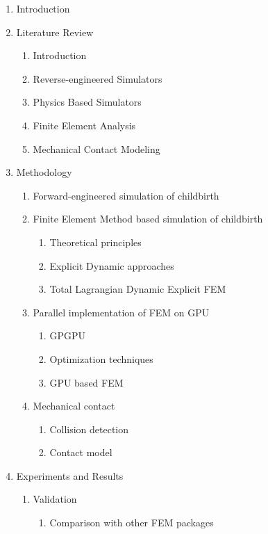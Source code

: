\label{proposedstructure}

\begin{enumerate}
\item Introduction
\item Literature Review
  \begin{enumerate}
  \item Introduction
  \item Reverse-engineered Simulators
  \item Physics Based Simulators
  \item Finite Element Analysis
  \item Mechanical Contact Modeling
  \end{enumerate}
\item Methodology
  \begin{enumerate}
    \item Forward-engineered simulation of childbirth
    \item Finite Element Method based simulation of childbirth
    \begin{enumerate}
      \item Theoretical principles
      \item Explicit Dynamic approaches
      \item Total Lagrangian Dynamic Explicit FEM
    \end{enumerate}
    \item Parallel implementation of FEM on GPU
    \begin{enumerate}
      \item GPGPU
      \item Optimization techniques
      \item GPU based FEM
    \end{enumerate}
    \item Mechanical contact
    \begin{enumerate}
      \item Collision detection
      \item Contact model
    \end{enumerate}
  \end{enumerate}
\item Experiments and Results
  \begin{enumerate}
    \item Validation
    \begin{enumerate}
      \item Comparison with other FEM packages
      \begin{enumerate}

\end{enumerate}
\end{enumerate}
\end{enumerate}
\end{enumerate}
